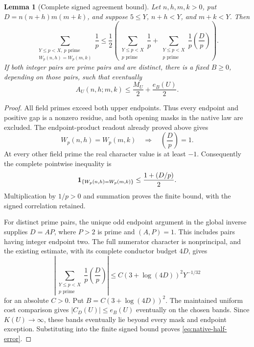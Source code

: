 \documentclass[11pt]{article}
\newtheorem{lemma}[theorem]{Lemma}
\begin{document}
\begin{lemma}[Complete signed agreement bound]
\label{lem:native-half-signed}
Let \(n,h,m,k>0\), put \(D=n(n+h)m(m+k)\), and suppose
\(5\le Y\), \(n+h<Y\), and \(m+k<Y\). Then
\[
 \sum_{\substack{Y\le p<X,\ p\text{ prime}\\
                   W_p(n,h)=W_p(m,k)}}\frac1p
 \le \frac12\left(
       \sum_{\substack{Y\le p<X\\p\text{ prime}}}\frac1p+
       \sum_{\substack{Y\le p<X\\p\text{ prime}}}
                          \frac1p\left(\frac Dp\right)\right).
\]
If both integer pairs are prime pairs and are distinct, there is a
fixed \(B\ge0\), depending on those pairs, such that eventually
\begin{equation}\label{eq:native-half-error}
 A_U(n,h;m,k)\le \frac{M_U}{2}+\frac{e_B(U)}2.
\end{equation}
\end{lemma}
\begin{proof}
All field primes exceed both upper endpoints. Thus every endpoint
and positive gap is a nonzero residue, and both opening masks in
the native law are excluded. The endpoint-product readout already
proved above gives
\[
 W_p(n,h)=W_p(m,k)\quad\Longrightarrow\quad
                         \left(\frac Dp\right)=1.
\]
At every other field prime the real character value is at least
\(-1\). Consequently the complete pointwise inequality is
\[
 {\bf1}_{\{W_p(n,h)=W_p(m,k)\}}
                  \le \frac{1+(D/p)}2.
\]
Multiplication by \(1/p>0\) and summation proves the finite bound,
with the signed correlation retained.

For distinct prime pairs, the unique odd endpoint argument in the
global inverse supplies \(D=AP\), where \(P>2\) is prime and
\((A,P)=1\). This includes pairs having integer endpoint two.
The full numerator character is nonprincipal, and the existing
estimate, with its complete conductor budget \(4D\), gives
\[
 \left|\sum_{\substack{Y\le p<X\\p\text{ prime}}}
                   \frac1p\left(\frac Dp\right)\right|
 \le C(3+\log(4D))^2Y^{-1/32}
\]
for an absolute \(C>0\). Put \(B=C(3+\log(4D))^2\).
The maintained uniform cost comparison gives
\(\lvert C_D(U)\rvert\le e_B(U)\) eventually on the chosen bands.
Since \(K(U)\to\infty\), these bands eventually lie beyond every
mask and endpoint exception. Substituting into the finite signed
bound proves \eqref{eq:native-half-error}.
\end{proof}
\end{document}

